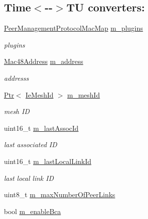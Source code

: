 \subsection*{Time$<$-\/-\/$>$TU converters\+:}
\begin{DoxyCompactItemize}
\item 
\hyperlink{classns3_1_1dot11s_1_1PeerManagementProtocol_a2fa189c91fb5125db3221e109005260a}{Peer\+Management\+Protocol\+Mac\+Map} \hyperlink{classns3_1_1dot11s_1_1PeerManagementProtocol_a9000d20f6feb3db279a020b237f49d64}{m\+\_\+plugins}
\begin{DoxyCompactList}\small\item\em plugins \end{DoxyCompactList}\item 
\hyperlink{classns3_1_1Mac48Address}{Mac48\+Address} \hyperlink{classns3_1_1dot11s_1_1PeerManagementProtocol_abe566c402f630f4df83bdeb2e84a1343}{m\+\_\+address}
\begin{DoxyCompactList}\small\item\em addresss \end{DoxyCompactList}\item 
\hyperlink{classns3_1_1Ptr}{Ptr}$<$ \hyperlink{classns3_1_1dot11s_1_1IeMeshId}{Ie\+Mesh\+Id} $>$ \hyperlink{classns3_1_1dot11s_1_1PeerManagementProtocol_ac69302a75abb04daf0dbf105451e0365}{m\+\_\+mesh\+Id}
\begin{DoxyCompactList}\small\item\em mesh ID \end{DoxyCompactList}\item 
uint16\+\_\+t \hyperlink{classns3_1_1dot11s_1_1PeerManagementProtocol_a675ea75c871f2436886b62d22821ffef}{m\+\_\+last\+Assoc\+Id}
\begin{DoxyCompactList}\small\item\em last associated ID \end{DoxyCompactList}\item 
uint16\+\_\+t \hyperlink{classns3_1_1dot11s_1_1PeerManagementProtocol_ae06ce79f95d75c8a89b3d74d98ff8ee8}{m\+\_\+last\+Local\+Link\+Id}
\begin{DoxyCompactList}\small\item\em last local link ID \end{DoxyCompactList}\item 
uint8\+\_\+t \hyperlink{classns3_1_1dot11s_1_1PeerManagementProtocol_a1cc5292332f46a548fd3ac6c2bec373a}{m\+\_\+max\+Number\+Of\+Peer\+Links}
\item 
bool \hyperlink{classns3_1_1dot11s_1_1PeerManagementProtocol_ae4cfbd2292a8d214ae8820fa6369763a}{m\+\_\+enable\+Bca}

\end{DoxyCompactItemize}
